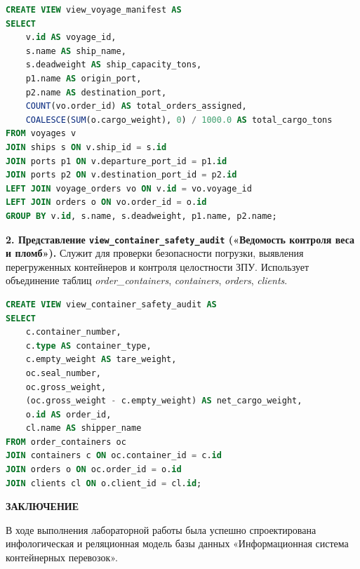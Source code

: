 \documentclass[a4paper,14pt]{article}
\begin{document}
\begin{lstlisting}[language=SQL]
CREATE VIEW view_voyage_manifest AS
SELECT 
    v.id AS voyage_id,
    s.name AS ship_name,
    s.deadweight AS ship_capacity_tons,
    p1.name AS origin_port,
    p2.name AS destination_port,
    COUNT(vo.order_id) AS total_orders_assigned,
    COALESCE(SUM(o.cargo_weight), 0) / 1000.0 AS total_cargo_tons
FROM voyages v
JOIN ships s ON v.ship_id = s.id
JOIN ports p1 ON v.departure_port_id = p1.id
JOIN ports p2 ON v.destination_port_id = p2.id
LEFT JOIN voyage_orders vo ON v.id = vo.voyage_id
LEFT JOIN orders o ON vo.order_id = o.id
GROUP BY v.id, s.name, s.deadweight, p1.name, p2.name;
\end{lstlisting}

\textbf{2. Представление \texttt{view\_container\_safety\_audit} («Ведомость контроля веса и пломб»).}
Служит для проверки безопасности погрузки, выявления перегруженных контейнеров и контроля целостности ЗПУ. Использует объединение таблиц \textit{order\_containers}, \textit{containers}, \textit{orders}, \textit{clients}.

\begin{lstlisting}[language=SQL]
CREATE VIEW view_container_safety_audit AS
SELECT 
    c.container_number,
    c.type AS container_type,
    c.empty_weight AS tare_weight,
    oc.seal_number,
    oc.gross_weight,
    (oc.gross_weight - c.empty_weight) AS net_cargo_weight,
    o.id AS order_id,
    cl.name AS shipper_name
FROM order_containers oc
JOIN containers c ON oc.container_id = c.id
JOIN orders o ON oc.order_id = o.id
JOIN clients cl ON o.client_id = cl.id;
\end{lstlisting}

\newpage
\begin{center}
    {\bfseries \MakeUppercase{Заключение}}
\end{center}

В ходе выполнения лабораторной работы была успешно спроектирована инфологическая и реляционная модель базы данных «Информационная система контейнерных перевозок».
\end{document}
